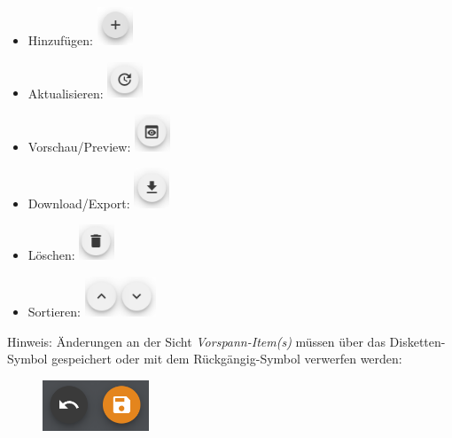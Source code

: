 \documentclass[
  letterpaper,
  DIV=11]{scrreprt}
\providecommand{\tightlist}{%
  \setlength{\itemsep}{0pt}\setlength{\parskip}{0pt}}\usepackage{longtable,booktabs,array}
\begin{document}
\begin{tcolorbox}
\begin{itemize}
\tightlist
\item
  Hinzufügen:
  \includegraphics[width=0.41667in,height=\textheight]{img/screenshot-add-project-plus-icon.png}
\item
  Aktualisieren:
  \includegraphics[width=0.41667in,height=\textheight]{img/screenshot-update-item-icon-01.png}
\item
  Vorschau/Preview:
  \includegraphics[width=0.41667in,height=\textheight]{img/screenshot-preview-icon-01.png}
\item
  Download/Export:
  \includegraphics[width=0.41667in,height=\textheight]{img/screenshot-download-item-icon-01.png}
\item
  Löschen:
  \includegraphics[width=0.41667in,height=\textheight]{img/screenshot-delete-item-icon-01.png}
\item
  Sortieren:
  \includegraphics[width=0.83333in,height=\textheight]{img/screenshot-sort-items-icon-01.png}
\end{itemize}

Hinweis: Änderungen an der Sicht \emph{Vorspann-Item(s)} müssen über das
Disketten-Symbol gespeichert oder mit dem Rückgängig-Symbol verwerfen
werden:

\begin{figure}[H]

\includegraphics[width=1.25in,height=\textheight]{img/screenshot-icons-undo-and-save-01.png} \hfill{}

\end{figure}

\end{tcolorbox}
\end{document}
